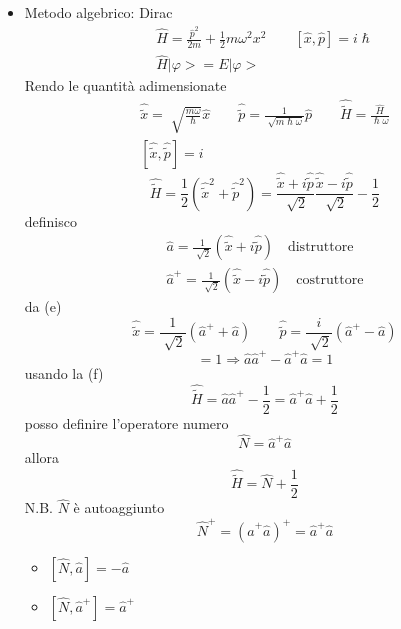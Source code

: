 \begin{itemize}
    \item Metodo algebrico: Dirac
    \begin{gather*}
        \hat{H} = \frac{\hat{p}^2}{2m} + \frac{1}{2} m\omega^2x^2 \qquad [\hat{x},\hat{p}] = i\hslash \\        
        \hat{H}|\varphi> = E|\varphi>
    \end{gather*}
    Rendo le quantità adimensionate
    \begin{gather*}
        \hat{\tilde{x}} = \sqrt[]{\frac{m\omega}{\hslash}}\hat{x} \qquad \hat{\tilde{p}} = \frac{1}{\sqrt[]{m\hslash\omega}}\hat{p} \qquad \hat{\tilde{H}} = \frac{\hat{H}}{\hslash \omega}  \\
        [\hat{\tilde{x}}, \hat{\tilde{p}}] = i 
    \end{gather*}
    \begin{equation*}
        \hat{\tilde{H}} = \frac{1}{2}(\hat{\tilde{x}}^2 + \hat{\tilde{p}}^2) = \frac{\hat{\tilde{x}}+ i \hat{\tilde{p}}}{\sqrt[]{2}}\frac{\hat{\tilde{x}}- i \hat{\tilde{p}}}{\sqrt[]{2}} - \frac{1}{2}
    \end{equation*}
definisco
\begin{equation*}
    \tag{e}
    \begin{aligned}
        \hat{a} = \frac{1}{\sqrt[]{2}}(\hat{\tilde{x}}+ i\hat{\tilde{p}}) \quad \text{distruttore} \\
        \hat{a}^+ = \frac{1}{\sqrt[]{2}}(\hat{\tilde{x}}- i\hat{\tilde{p}}) \quad \text{costruttore}
    \end{aligned}
\end{equation*}
da (e) 
\begin{equation*}
    \hat{\tilde{x}} = \frac{1}{\sqrt[]{2}}(\hat{a}^++\hat{a}) \qquad \hat{\tilde{p}} = \frac{i}{\sqrt[]{2}}(\hat{a}^+-\hat{a})
\end{equation*}
\begin{equation*}
    [\hat{a},\hat{a}^+] = 1 \Rightarrow \hat{a}\hat{a}^+ -\hat{a}^+\hat{a} = 1 \tag{f}
\end{equation*}
usando la (f)
\begin{equation*}
    \hat{\tilde{H}} = \hat{a}\hat{a}^+ -\frac{1}{2} = \hat{a}^+\hat{a} + \frac{1}{2}
\end{equation*}
posso definire l'operatore numero
\begin{equation*}
    \hat{N} = \hat{a}^+\hat{a}
\end{equation*}
allora
\begin{equation*}
    \hat{\tilde{H}} = \hat{N} + \frac{1}{2}
\end{equation*}
N.B. \(\hat{N}\) è autoaggiunto
\begin{equation*}
    \hat{N}^+ = {(\hat{a}^+\hat{a})}^+ = \hat{a}^+\hat{a}
\end{equation*}
\begin{itemize}
    \item \([\hat{N},\hat{a}] = -\hat{a}\)
    \item \([\hat{N},\hat{a}^+] = \hat{a}^+\)
\end{itemize}
\end{itemize}

